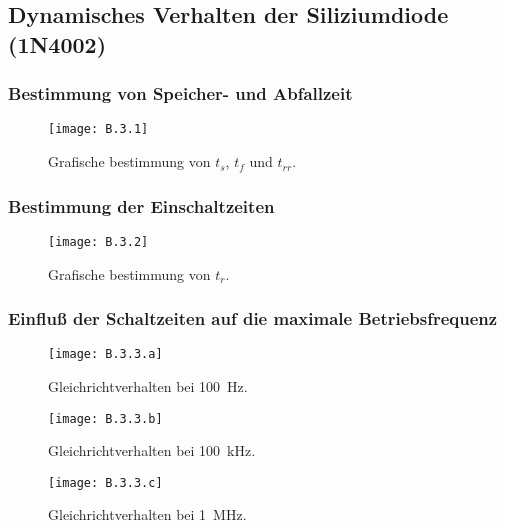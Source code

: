 \documentclass[
	a4paper, %
	12pt, %
]{CSUniSchoolLabReport}
\begin{document}
\subsection{Dynamisches Verhalten der Siliziumdiode (1N4002)}
\subsubsection{Bestimmung von Speicher- und Abfallzeit}
\begin{figure}[H] %
	\centering %
	\texttt{[image: B.3.1]} %
	\caption{Grafische bestimmung von $t_s$, $t_f$ und $t_{rr}$.}
\end{figure}

\subsubsection{Bestimmung der Einschaltzeiten}
\begin{figure}[H] %
	\centering %
	\texttt{[image: B.3.2]} %
	\caption{Grafische bestimmung von $t_r$.}
\end{figure}

\subsubsection{Einfluß der Schaltzeiten auf die maximale Betriebsfrequenz}
\begin{figure}[H] %
	\centering %
	\texttt{[image: B.3.3.a]} %
	\caption{Gleichrichtverhalten bei \SI{100}{\hertz}.}
\end{figure}
\begin{figure}[H] %
	\centering %
	\texttt{[image: B.3.3.b]} %
	\caption{Gleichrichtverhalten bei \SI{100}{\kilo\hertz}.}
\end{figure}
\begin{figure}[H] %
	\centering %
	\texttt{[image: B.3.3.c]} %
	\caption{Gleichrichtverhalten bei \SI{1}{\mega\hertz}.}
\end{figure}
\end{document}
